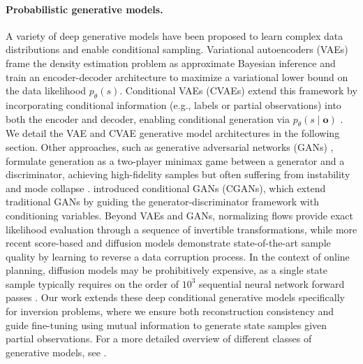\paragraph{Probabilistic generative models.}
A variety of deep generative models have been proposed to learn complex data distributions and enable conditional sampling. Variational autoencoders (VAEs) \cite{kingma2013vae,rezende2014stochastic} frame the density estimation problem as approximate Bayesian inference and train an encoder-decoder architecture to maximize a variational lower bound on the data likelihood $p_\theta(s)$.
Conditional VAEs (CVAEs) extend this framework by incorporating conditional information (e.g., labels or partial observations) into both the encoder and decoder, enabling conditional generation via $p_\theta(s \mid \mathbf{o})$ \cite{sohn2015learning}.
We detail the VAE and CVAE generative model architectures in the following section.
Other approaches, such as generative adversarial networks (GANs) \cite{goodfellow2014generative}, formulate generation as a two-player minimax game between a generator and a discriminator, achieving high-fidelity samples but often suffering from instability and mode collapse \cite{metz2016unrolled}.
\textcite{mirza2014conditional} introduced conditional GANs (CGANs), which extend traditional GANs by guiding the generator-discriminator framework with conditioning variables.
Beyond VAEs and GANs, normalizing flows \cite{rezende2015variational} provide exact likelihood evaluation through a sequence of invertible transformations, while more recent score-based and diffusion models \cite{ho2020denoising,song2021score} demonstrate state-of-the-art sample quality by learning to reverse a data corruption process.
In the context of online planning, diffusion models may be prohibitively expensive, as a single state sample typically requires on the order of $10^3$ sequential neural network forward passes \cite{ho2020denoising,nichol2021improved,janner2022planning}.
Our work extends these deep conditional generative models specifically for inversion problems, where we ensure both reconstruction consistency and guide fine-tuning using mutual information to generate state samples given partial observations.
For a more detailed overview of different classes of generative models, see \textcite{cao2023comprehensive}.

